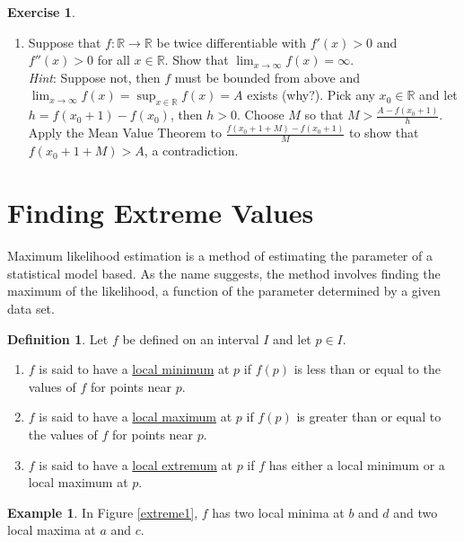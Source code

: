 \documentclass[12pt,letterpaper]{book}
\numberwithin{equation}{section}
\theoremstyle{definition}
\newtheorem{defi}[thm]{\textbf{Definition}}
\newtheorem{example}[thm]{\textbf{Example}}
\newtheorem{exercise}{\textbf{Exercise}}[chapter]
\begin{document}
\begin{exercise}
\begin{enumerate}[\bfseries 1.]
\item Suppose that $f:\mathbb{R}\to \mathbb{R}$ be twice differentiable with $f'(x)>0$ and $f''(x)>0$ for all $x\in \mathbb{R}$. Show that $\displaystyle{\lim_{x\to\infty}f(x)=\infty}$. 
\\\textit{Hint}: Suppose not, then $f$ must be bounded from above and $\displaystyle{\lim_{x\to\infty}f(x)=\sup_{x\in \mathbb{R}} f(x)=A}$ exists (why?). Pick any $x_0\in \mathbb{R}$ and let $h=f(x_0+1)-f(x_0)$, then $h>0$. Choose $M$ so that $M>\frac{A-f(x_0+1)}{h}$. Apply the Mean Value Theorem to $\frac{f(x_0+1+M)-f(x_0+1)}{M}$ to show that $f(x_0+1+M)>A$, a contradiction.
\end{enumerate}
\end{exercise}

\section{Finding Extreme Values}

Maximum likelihood estimation is a method of estimating the parameter of a statistical model based. As the name suggests, the method involves finding the maximum of the likelihood, a function of the parameter determined by a given data set.

\begin{defi} Let $f$ be defined on an interval $I$ and let $p\in I$.
\begin{enumerate}
\item $f$ is said to have a \underline{local minimum} at $p$ if $f(p)$ is less than or equal to the values of $f$ for points near $p$.
\item $f$ is said to have a \underline{local maximum} at $p$ if $f(p)$ is greater than or equal to the values of $f$ for points near $p$.
\item $f$ is said to have a \underline{local extremum} at $p$ if $f$ has either a local minimum or a local maximum at $p$.
\end{enumerate}
\end{defi}

\begin{example} In Figure \ref{extreme1}, $f$ has two local minima at $b$ and $d$ and two local maxima at $a$ and $c$.
\end{example}
\end{document}

